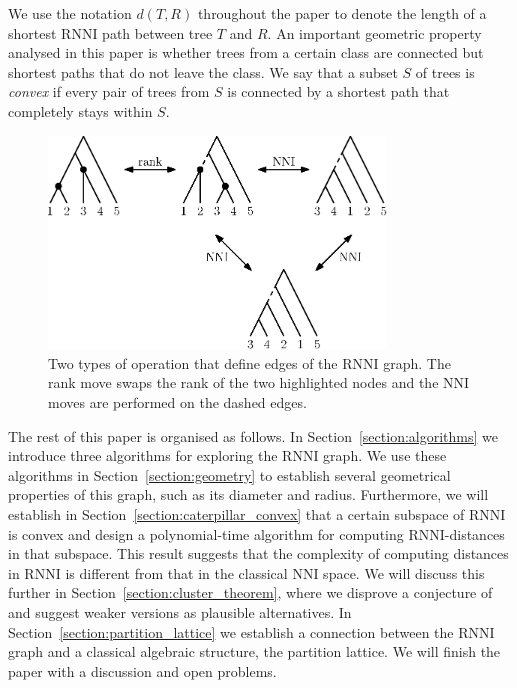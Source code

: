 \documentclass{amsart}
\newcommand{\nni}{\mathrm{NNI}}
\newcommand{\rnni}{\mathrm{RNNI}}
\begin{document}
We use the notation $d(T, R)$ throughout the paper to denote the length of a shortest $\rnni$ path between tree $T$ and $R$.
An important geometric property analysed in this paper is whether trees from a certain class are connected but shortest paths that do not leave the class.
We say that a subset $S$ of trees is \emph{convex} if every pair of trees from $S$ is connected by a shortest path that completely stays within $S$.

\begin{figure}[H]
\centering
\includegraphics[width=0.8\textwidth]{RNNI}
\vspace{12pt}
\caption{Two types of operation that define edges of the $\rnni$ graph.
The rank move swaps the rank of the two highlighted nodes and the $\nni$ moves are performed on the dashed edges.}
\label{fig:RNNI}
\end{figure}

The rest of this paper is organised as follows.
In Section~\ref{section:algorithms} we introduce three algorithms for exploring the $\rnni$ graph.
We use these algorithms in Section~\ref{section:geometry} to establish several geometrical properties of this graph, such as its diameter and radius.
Furthermore, we will establish in Section~\ref{section:caterpillar_convex} that a certain subspace of $\rnni$ is convex and design a polynomial-time algorithm for computing $\rnni$-distances in that subspace.
This result suggests that the complexity of computing distances in $\rnni$ is different from that in the classical $\nni$ space.
We will discuss this further in Section~\ref{section:cluster_theorem}, where we disprove a conjecture of \textcite{Gavryushkin2018-ol} and suggest weaker versions as plausible alternatives.
In Section~\ref{section:partition_lattice} we establish a connection between the $\rnni$ graph and a classical algebraic structure, the partition lattice.
We will finish the paper with a discussion and open problems.
\end{document}
